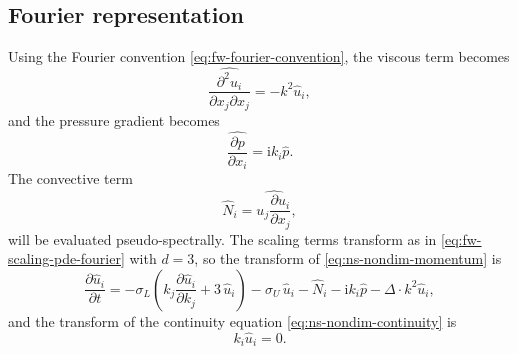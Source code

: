 \subsection{Fourier representation}\label{ssec:ns-fourier}
Using the Fourier convention \eqref{eq:fw-fourier-convention}, the viscous
term becomes
\begin{equation}\label{eq:ns-fourier-viscous}
  \widehat{\frac{\partial^2 u_i}{\partial x_j \partial x_j}} = -k^2 \hat{u}_i,
\end{equation}
and the pressure gradient becomes
\begin{equation}\label{eq:ns-fourier-pressure}
  \widehat{\frac{\partial p}{\partial x_i}} = \mathrm{i} k_i \hat{p}.
\end{equation}
The convective term
\begin{equation}\label{eq:ns-fourier-convection}
  \hat{N}_i = \widehat{u_j \frac{\partial u_i}{\partial x_j}},
\end{equation}
will be evaluated pseudo-spectrally. The scaling terms transform as in
\eqref{eq:fw-scaling-pde-fourier} with $d = 3$, so the transform of
\eqref{eq:ns-nondim-momentum} is
\begin{equation}\label{eq:ns-nondim-momentum-fourier}
  \frac{\partial \hat{u}_i}{\partial t}
  = -\sigma_L \left( k_j \frac{\partial \hat{u}_i}{\partial k_j} + 3\, \hat{u}_i \right)
  - \sigma_U\, \hat{u}_i
  - \hat{N}_i
  - \mathrm{i} k_i \hat{p}
  - \Delta \cdot k^2 \hat{u}_i,
\end{equation}
and the transform of the continuity equation
\eqref{eq:ns-nondim-continuity} is
\begin{equation}\label{eq:ns-fourier-continuity}
  k_i \hat{u}_i = 0.
\end{equation}

